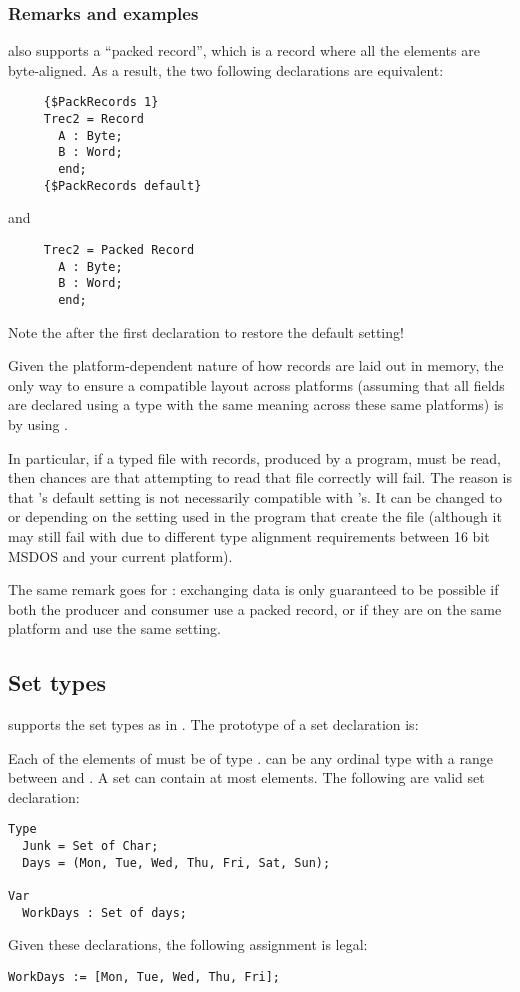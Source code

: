 \subsubsection{Remarks and examples}

\fpc also supports a ``packed record'', which is a record where all the
elements are byte-aligned. As a result, the two following declarations
are equivalent:
\begin{verbatim}
     {$PackRecords 1}
     Trec2 = Record
       A : Byte;
       B : Word;
       end;
     {$PackRecords default}
\end{verbatim}
and
\begin{verbatim}
     Trec2 = Packed Record
       A : Byte;
       B : Word;
       end;
\end{verbatim}
Note the  after the first declaration to
restore the default setting!

Given the platform-dependent nature of how records are laid out in
memory, the only way to ensure a compatible layout across platforms
(assuming that all fields are declared using a type with the same
meaning across these same platforms) is by using .

In particular, if a typed file with records, produced by a \tp program,
must be read, then chances are that attempting to read that file
correctly will fail. The reason is that \fpc{}'s default
 setting is not necessarily compatible with
\tp{}'s. It can be changed to  or
 depending on the setting used in the \tp
program that create the file (although it may still fail with
 due to different type alignment requirements
between 16 bit MSDOS and your current platform).

The same remark goes for \delphi{}: exchanging data is only guaranteed
to be possible if both the producer and consumer use a packed record, or
if they are on the same platform and use the same  setting.


%
\subsection{Set types}
\fpc supports the set types as in \tp. The prototype of a set
declaration is:

Each of the elements of  must be of type .
 can be any ordinal type with a range between  and
. A set can contain at most  elements.
The following are valid set declaration:
\begin{verbatim}
Type
  Junk = Set of Char;
  Days = (Mon, Tue, Wed, Thu, Fri, Sat, Sun);

Var
  WorkDays : Set of days;
\end{verbatim}
Given these declarations, the following assignment is legal:
\begin{verbatim}
WorkDays := [Mon, Tue, Wed, Thu, Fri];
\end{verbatim}

